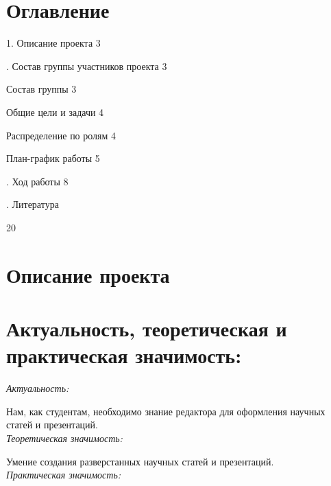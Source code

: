 \documentclass{article}
\begin{document}
\section*{Оглавление}
\LARGE{
1. Описание проекта \hspace{79mm} 3
\vspace{\baselineskip}

. Состав группы участников проекта \hspace{35mm} 3
\vspace{\baselineskip}

Состав группы \hspace{87mm} 3
\vspace{\baselineskip}

Общие цели и задачи \hspace{72mm} 4
\vspace{\baselineskip}

Распределение по ролям \hspace{63mm} 4
\vspace{\baselineskip}

План-график работы \hspace{71mm} 5
\vspace{\baselineskip}

. Ход работы \hspace{96mm} 8
\vspace{\baselineskip}

. Литература} \hspace{93mm} 20
\newpage
\section{Описание проекта}
	\section*{Актуальность, теоретическая и практическая значимость:}
	
	
	\noindent\emph{Актуальность:}
	
	
	\noindent Нам, как студентам, необходимо знание редактора для оформления научных статей и презентаций.\\
	
	
	\noindent\emph{Теоретическая значимость:}
	
	
	\noindent Умение создания разверстанных научных статей и презентаций.\\
	
	
	\noindent\emph{Практическая значимость:}
	
\end{document}
